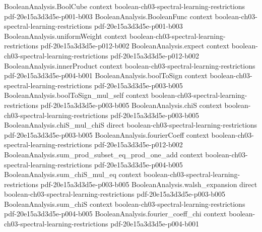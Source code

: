 \begin{lemma}
\leanok
{}
\label{KKL.tail_fourier_weight_bound}
\proofstep
  {BooleanAnalysis.BoolCube}
  {context}
  {boolean-ch03-spectral-learning-restrictions}
  {pdf-20e15a3d3d5e-p001-b003}
\proofstep
  {BooleanAnalysis.BooleanFunc}
  {context}
  {boolean-ch03-spectral-learning-restrictions}
  {pdf-20e15a3d3d5e-p001-b003}
\proofstep
  {BooleanAnalysis.uniformWeight}
  {context}
  {boolean-ch03-spectral-learning-restrictions}
  {pdf-20e15a3d3d5e-p012-b002}
\proofstep
  {BooleanAnalysis.expect}
  {context}
  {boolean-ch03-spectral-learning-restrictions}
  {pdf-20e15a3d3d5e-p012-b002}
\proofstep
  {BooleanAnalysis.innerProduct}
  {context}
  {boolean-ch03-spectral-learning-restrictions}
  {pdf-20e15a3d3d5e-p004-b001}
\proofstep
  {BooleanAnalysis.boolToSign}
  {context}
  {boolean-ch03-spectral-learning-restrictions}
  {pdf-20e15a3d3d5e-p003-b005}
\proofstep
  {BooleanAnalysis.boolToSign_mul_self}
  {context}
  {boolean-ch03-spectral-learning-restrictions}
  {pdf-20e15a3d3d5e-p003-b005}
\proofstep
  {BooleanAnalysis.chiS}
  {context}
  {boolean-ch03-spectral-learning-restrictions}
  {pdf-20e15a3d3d5e-p003-b005}
\proofstep
  {BooleanAnalysis.chiS_mul_chiS}
  {direct}
  {boolean-ch03-spectral-learning-restrictions}
  {pdf-20e15a3d3d5e-p003-b005}
\proofstep
  {BooleanAnalysis.fourierCoeff}
  {context}
  {boolean-ch03-spectral-learning-restrictions}
  {pdf-20e15a3d3d5e-p012-b002}
\proofstep
  {BooleanAnalysis.sum_prod_subset_eq_prod_one_add}
  {context}
  {boolean-ch03-spectral-learning-restrictions}
  {pdf-20e15a3d3d5e-p004-b005}
\proofstep
  {BooleanAnalysis.sum_chiS_mul_eq}
  {context}
  {boolean-ch03-spectral-learning-restrictions}
  {pdf-20e15a3d3d5e-p003-b005}
\proofstep
  {BooleanAnalysis.walsh_expansion}
  {direct}
  {boolean-ch03-spectral-learning-restrictions}
  {pdf-20e15a3d3d5e-p003-b005}
\proofstep
  {BooleanAnalysis.sum_chiS}
  {context}
  {boolean-ch03-spectral-learning-restrictions}
  {pdf-20e15a3d3d5e-p004-b005}
\proofstep
  {BooleanAnalysis.fourier_coeff_chi}
  {context}
  {boolean-ch03-spectral-learning-restrictions}
  {pdf-20e15a3d3d5e-p004-b001}

\end{lemma}
